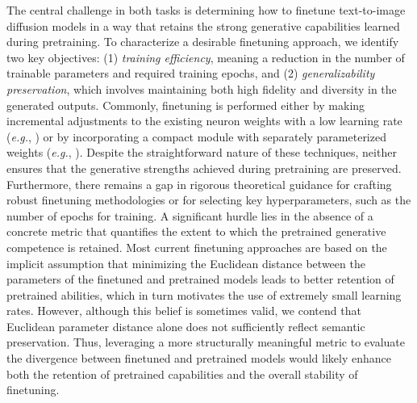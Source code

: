 The central challenge in both tasks is determining how to finetune text-to-image diffusion models in a way that retains the strong generative capabilities learned during pretraining. To characterize a desirable finetuning approach, we identify two key objectives: (1) \emph{training efficiency}, meaning a reduction in the number of trainable parameters and required training epochs, and (2) \emph{generalizability preservation}, which involves maintaining both high fidelity and diversity in the generated outputs. Commonly, finetuning is performed either by making incremental adjustments to the existing neuron weights with a low learning rate (\emph{e.g.}, \cite{ruiz2023dreambooth}) or by incorporating a compact module with separately parameterized weights (\emph{e.g.}, \cite{hulora2022,zhang2023adding}). Despite the straightforward nature of these techniques, neither ensures that the generative strengths achieved during pretraining are preserved. Furthermore, there remains a gap in rigorous theoretical guidance for crafting robust finetuning methodologies or for selecting key hyperparameters, such as the number of epochs for training. A significant hurdle lies in the absence of a concrete metric that quantifies the extent to which the pretrained generative competence is retained. Most current finetuning approaches are based on the implicit assumption that minimizing the Euclidean distance between the parameters of the finetuned and pretrained models leads to better retention of pretrained abilities, which in turn motivates the use of extremely small learning rates. However, although this belief is sometimes valid, we contend that Euclidean parameter distance alone does not sufficiently reflect semantic preservation. Thus, leveraging a more structurally meaningful metric to evaluate the divergence between finetuned and pretrained models would likely enhance both the retention of pretrained capabilities and the overall stability of finetuning.

